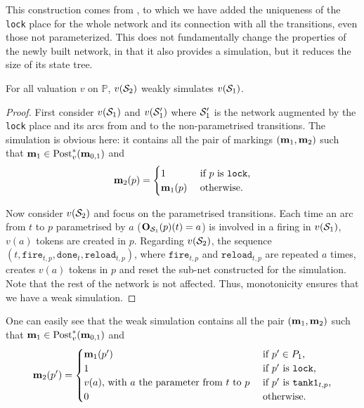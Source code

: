 This construction comes from \cite{David17}, to which we have added the uniqueness of the \texttt{lock} place for the whole network and its connection with all the transitions, even those not parameterized.
This does not fundamentally change the properties of the newly built network, in that it also provides a simulation, but it reduces the size of its state tree.

\begin{lemm}
  For all valuation $v$ on $\mathbb{P}$, $v(\mathcal{S}_2)$ weakly simulates $v(\mathcal{S}_1)$.
\end{lemm}

\begin{proof}
  First consider $v(\mathcal{S}_1)$ and $v(\mathcal{S}_1')$ where $\mathcal{S}_1'$ is the network augmented by the \texttt{lock} place and its arcs from and to the non-parametrised transitions.
  The simulation is obvious here: it contains all the pair of markings $(\mathbf{m}_1, \mathbf{m}_2)$ such that $\mathbf{m}_1 \in \operatorname{Post}^*_v(\mathbf{m}_{0,1})$ and
  \[
    \mathbf{m}_2(p) =
      \begin{cases}
        1 &\text{ if $p$ is \texttt{lock},} \\
        \mathbf{m}_1(p) &\text{ otherwise.}
      \end{cases}
  \]

  Now consider $v(\mathcal{S}_2)$ and focus on the parametrised transitions.
  Each time an arc from $t$ to $p$ parametrised by $a$ ($\mathbf{O}_{\mathcal{S}_1}(p)(t) = a$) is involved in a firing in $v(\mathcal{S}_1)$, $v(a)$ tokens are created in $p$.
  Regarding $v(\mathcal{S}_2)$, the sequence $(t, \mathtt{fire}_{t,p}, \mathtt{done}_t, \mathtt{reload}_{t,p})$, where $\mathtt{fire}_{t,p}$ and $\mathtt{reload}_{t,p}$ are repeated $a$ times, creates $v(a)$ tokens in $p$ and reset the sub-net constructed for the simulation. Note that the rest of the network is not affected. Thus, monotonicity ensures that we have a weak simulation.
\end{proof}

One can easily see that the weak simulation contains all the pair $(\mathbf{m}_1, \mathbf{m}_2)$ such that $\mathbf{m}_1 \in \operatorname{Post}^*_v(\mathbf{m}_{0,1})$ and
\[
  \mathbf{m}_2(p') =
    \begin{cases}
      \mathbf{m}_1(p') &\text{ if } p' \in P_1 \text{,}\\
      1 &\text{ if $p'$ is \texttt{lock},} \\
      v(a)\text{, with $a$ the parameter from $t$ to $p$} &\text{ if $p'$ is }\mathtt{tank1}_{t,p}\text{,} \\
      0 &\text{ otherwise.}
    \end{cases}
\]

